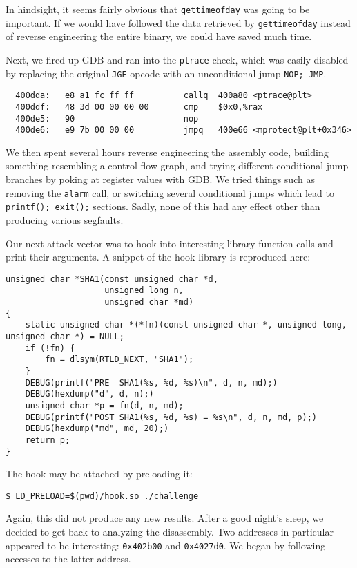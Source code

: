 \documentclass[a4paper,10pt]{article}
\begin{document}
In hindsight, it seems fairly obvious that \lstinline|gettimeofday| was going to be important.
If we would have followed the data retrieved by \lstinline|gettimeofday| instead of
reverse engineering the entire binary, we could have saved much time.

Next, we fired up GDB and ran into the \lstinline|ptrace| check, which was easily
disabled by replacing the original \lstinline|JGE| opcode with an unconditional jump
\lstinline|NOP; JMP|.

\begin{lstlisting}
  400dda:	e8 a1 fc ff ff       	callq  400a80 <ptrace@plt>
  400ddf:	48 3d 00 00 00 00    	cmp    $0x0,%rax
  400de5:	90                   	nop
  400de6:	e9 7b 00 00 00       	jmpq   400e66 <mprotect@plt+0x346>
\end{lstlisting}

We then spent several hours reverse engineering the assembly code, building something
resembling a control flow graph, and trying different conditional jump branches by
poking at register values with GDB. We tried things such as removing the \lstinline|alarm|
call, or switching several conditional jumps which lead to \lstinline|printf(); exit();| sections.
Sadly, none of this had any effect other than producing various segfaults.

Our next attack vector was to hook into interesting library function calls and
print their arguments. A snippet of the hook library is reproduced here:

\begin{lstlisting}
unsigned char *SHA1(const unsigned char *d,
                    unsigned long n,
                    unsigned char *md)
{    
	static unsigned char *(*fn)(const unsigned char *, unsigned long, unsigned char *) = NULL;
    if (!fn) {
        fn = dlsym(RTLD_NEXT, "SHA1");
    }
    DEBUG(printf("PRE  SHA1(%s, %d, %s)\n", d, n, md);)
    DEBUG(hexdump("d", d, n);)
    unsigned char *p = fn(d, n, md);
    DEBUG(printf("POST SHA1(%s, %d, %s) = %s\n", d, n, md, p);)
    DEBUG(hexdump("md", md, 20);)
    return p;
}
\end{lstlisting}

The hook may be attached by preloading it:

\begin{verbatim}
$ LD_PRELOAD=$(pwd)/hook.so ./challenge
\end{verbatim}

Again, this did not produce any new results. After a good night's sleep,
we decided to get back to analyzing the disassembly. Two addresses in particular
appeared to be interesting: \verb|0x402b00| and \verb|0x4027d0|. We began
by following accesses to the latter address.
\end{document}

